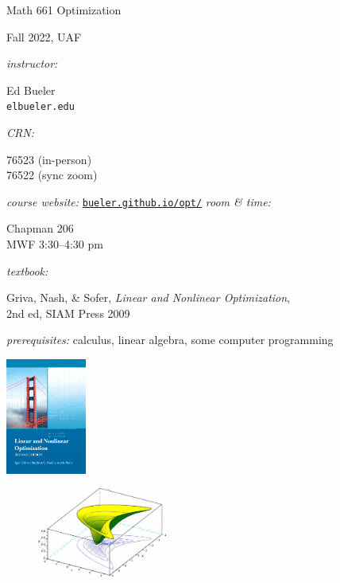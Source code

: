 \documentclass[12pt]{amsart}
\begin{document}
\begin{center}
\Huge Math 661 Optimization

\Large \medskip

Fall 2022, UAF
\end{center}

\thispagestyle{empty}
\bigskip\bigskip

\noindent \emph{instructor:} \begin{minipage}[t]{0.5\textwidth} Ed Bueler \\ \texttt{elbueler\@@alaska.edu} \end{minipage} \hfill \emph{CRN:}\, \begin{minipage}[t]{0.25\textwidth} 76523 (in-person) \\ 76522 (sync zoom) \end{minipage}

\medskip
\noindent \emph{course website:} \href{https://bueler.github.io/opt/}{\texttt{bueler.github.io/opt/}} \hfill \emph{room \& time:} \begin{minipage}[t]{0.25\textwidth} Chapman 206 \\ MWF 3:30--4:30 pm \end{minipage}

\medskip
\noindent \emph{textbook:} \begin{minipage}[t]{0.7\textwidth} Griva, Nash, \& Sofer, \emph{Linear and Nonlinear Optimization}, \\ 2nd ed, SIAM Press 2009 \end{minipage}

\bigskip
\noindent \emph{prerequisites:} calculus, linear algebra, some computer programming

\vspace{-16mm}
\hfill \includegraphics[height=38mm]{../images/cover.jpg}

\vspace{5mm}

\begin{figure}
  \centering
    \includegraphics[width=0.38\textwidth]{../images/banana.png}
\end{figure}
\end{document}
